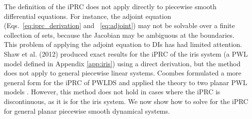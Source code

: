 \documentclass[12pt]{article}
\begin{document}
The definition of the iPRC does not apply directly to piecewise smooth differential equations.  For instance, the adjoint equation (Eqs.~\ref{eq:iprc_derivation} and ~\ref{eq:adjoint}) may not be solvable over a finite collection of sets, because the Jacobian may be ambiguous at the boundaries.  This problem of applying the adjoint equation to DIs has had limited attention.  Shaw et al. (2012) produced exact results for the iPRC of the iris system (a PWL model defined in Appendix \ref{app:iris}) using a direct derivation, but the method does not apply to general piecewise linear systems.  Coombes formulated a more general form for the iPRC of PWLDS and applied the theory to two planar PWL models \cite{Coombes:2008:SIADS}.  However, this method does not hold in cases where the iPRC is discontinuous, as it is for the iris system.  We now show how to solve for the iPRC for general planar piecewise smooth dynamical systems.

\newpage
%



\end{document}
